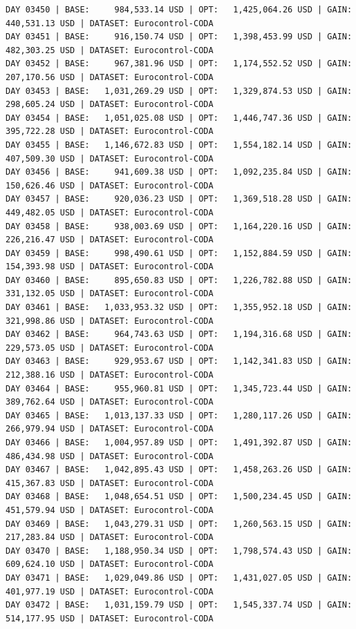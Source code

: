 \documentclass[11pt,a4paper]{article}
\begin{document}
\begin{verbatim}
DAY 03450 | BASE:     984,533.14 USD | OPT:   1,425,064.26 USD | GAIN: 440,531.13 USD | DATASET: Eurocontrol-CODA
DAY 03451 | BASE:     916,150.74 USD | OPT:   1,398,453.99 USD | GAIN: 482,303.25 USD | DATASET: Eurocontrol-CODA
DAY 03452 | BASE:     967,381.96 USD | OPT:   1,174,552.52 USD | GAIN: 207,170.56 USD | DATASET: Eurocontrol-CODA
DAY 03453 | BASE:   1,031,269.29 USD | OPT:   1,329,874.53 USD | GAIN: 298,605.24 USD | DATASET: Eurocontrol-CODA
DAY 03454 | BASE:   1,051,025.08 USD | OPT:   1,446,747.36 USD | GAIN: 395,722.28 USD | DATASET: Eurocontrol-CODA
DAY 03455 | BASE:   1,146,672.83 USD | OPT:   1,554,182.14 USD | GAIN: 407,509.30 USD | DATASET: Eurocontrol-CODA
DAY 03456 | BASE:     941,609.38 USD | OPT:   1,092,235.84 USD | GAIN: 150,626.46 USD | DATASET: Eurocontrol-CODA
DAY 03457 | BASE:     920,036.23 USD | OPT:   1,369,518.28 USD | GAIN: 449,482.05 USD | DATASET: Eurocontrol-CODA
DAY 03458 | BASE:     938,003.69 USD | OPT:   1,164,220.16 USD | GAIN: 226,216.47 USD | DATASET: Eurocontrol-CODA
DAY 03459 | BASE:     998,490.61 USD | OPT:   1,152,884.59 USD | GAIN: 154,393.98 USD | DATASET: Eurocontrol-CODA
DAY 03460 | BASE:     895,650.83 USD | OPT:   1,226,782.88 USD | GAIN: 331,132.05 USD | DATASET: Eurocontrol-CODA
DAY 03461 | BASE:   1,033,953.32 USD | OPT:   1,355,952.18 USD | GAIN: 321,998.86 USD | DATASET: Eurocontrol-CODA
DAY 03462 | BASE:     964,743.63 USD | OPT:   1,194,316.68 USD | GAIN: 229,573.05 USD | DATASET: Eurocontrol-CODA
DAY 03463 | BASE:     929,953.67 USD | OPT:   1,142,341.83 USD | GAIN: 212,388.16 USD | DATASET: Eurocontrol-CODA
DAY 03464 | BASE:     955,960.81 USD | OPT:   1,345,723.44 USD | GAIN: 389,762.64 USD | DATASET: Eurocontrol-CODA
DAY 03465 | BASE:   1,013,137.33 USD | OPT:   1,280,117.26 USD | GAIN: 266,979.94 USD | DATASET: Eurocontrol-CODA
DAY 03466 | BASE:   1,004,957.89 USD | OPT:   1,491,392.87 USD | GAIN: 486,434.98 USD | DATASET: Eurocontrol-CODA
DAY 03467 | BASE:   1,042,895.43 USD | OPT:   1,458,263.26 USD | GAIN: 415,367.83 USD | DATASET: Eurocontrol-CODA
DAY 03468 | BASE:   1,048,654.51 USD | OPT:   1,500,234.45 USD | GAIN: 451,579.94 USD | DATASET: Eurocontrol-CODA
DAY 03469 | BASE:   1,043,279.31 USD | OPT:   1,260,563.15 USD | GAIN: 217,283.84 USD | DATASET: Eurocontrol-CODA
DAY 03470 | BASE:   1,188,950.34 USD | OPT:   1,798,574.43 USD | GAIN: 609,624.10 USD | DATASET: Eurocontrol-CODA
DAY 03471 | BASE:   1,029,049.86 USD | OPT:   1,431,027.05 USD | GAIN: 401,977.19 USD | DATASET: Eurocontrol-CODA
DAY 03472 | BASE:   1,031,159.79 USD | OPT:   1,545,337.74 USD | GAIN: 514,177.95 USD | DATASET: Eurocontrol-CODA

\end{verbatim}
\end{document}
